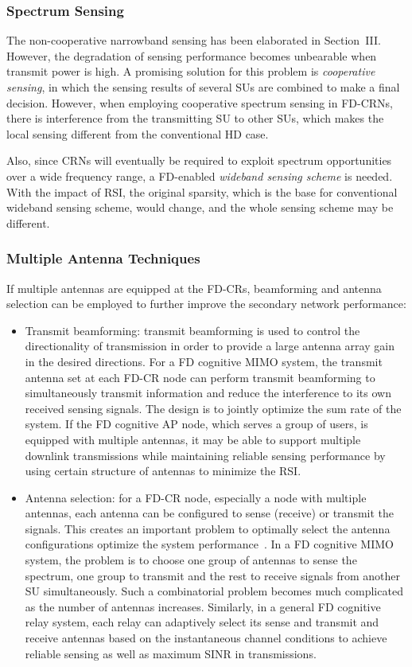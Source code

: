 \documentclass[onecolumn,12pt]{IEEEtran}
\begin{document}
\subsubsection{Spectrum Sensing}
The non-cooperative narrowband sensing has been elaborated in Section~III. However, the degradation of sensing performance becomes unbearable when transmit power is high. A promising solution for this problem is \emph{cooperative sensing}, in which the sensing results of several SUs are combined to make a final decision. However, when employing cooperative spectrum sensing in FD-CRNs, there is interference from the transmitting SU to other SUs, which makes the local sensing different from the conventional HD case\cite{liao2014iccs}.

Also, since CRNs will eventually be required to exploit spectrum opportunities over a wide frequency range, a FD-enabled \emph{wideband sensing scheme} is needed. With the impact of RSI, the original sparsity, which is the base for conventional wideband sensing scheme, would change, and the whole sensing scheme may be different.


\subsubsection{Multiple Antenna Techniques}

If multiple antennas are equipped at the FD-CRs, beamforming and antenna selection can be employed to further improve the secondary network performance:

\begin{itemize}
  \item Transmit beamforming: transmit beamforming is used to control the directionality of transmission in order to provide a large antenna array gain in the desired directions. For a FD cognitive MIMO system, the transmit antenna set at each FD-CR node can perform transmit beamforming to simultaneously transmit information and reduce the interference to its own received sensing signals. The design is to jointly optimize the sum rate of the system. If the FD cognitive AP node, which serves a group of users, is equipped with multiple antennas, it may be able to support multiple downlink transmissions while maintaining reliable sensing performance by using certain structure of antennas to minimize the RSI.

  \item Antenna selection: for a FD-CR node, especially a node with multiple antennas, each antenna can be configured to sense (receive) or transmit the signals. This creates an important problem to optimally select the antenna configurations optimize the system performance~\cite{zhou2014}. In a FD cognitive MIMO system, the problem is to choose one group of antennas to sense the spectrum, one group to transmit and the rest to receive signals from another SU simultaneously. Such a combinatorial problem becomes much complicated as the number of antennas increases. Similarly, in a general FD cognitive relay system, each relay can adaptively select its sense and transmit and receive antennas based on the instantaneous channel conditions to achieve reliable sensing as well as maximum SINR in transmissions.
\end{itemize}
\end{document}
